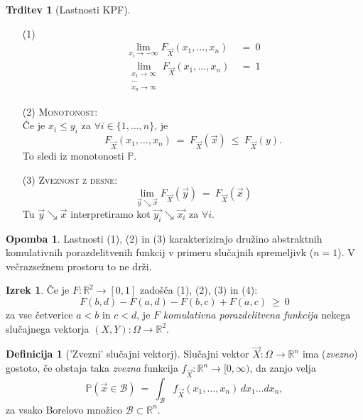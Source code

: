 \documentclass[11pt]{article}
\newcommand{\1}{\mathbbm{1}}
\theoremstyle{definition}
\newtheorem{definicija}{Definicija}[section]
\theoremstyle{definition}
\newtheorem{trditev}{Trditev}[section]
\theoremstyle{definition}
\newtheorem{izrek}{Izrek}[section]
\newtheorem*{opomba}{Opomba}
\begin{document}
\begin{trditev}[Lastnosti KPF]
~
\begin{enumerate}

	\item[(1)] \begin{align*}
		\lim_{x_i \rightarrow -\infty} F_{\vec{X}}(x_1, \ldots, x_n) ~&=~ 0 \\
		\lim_{\substack{x_1 \rightarrow \infty \\ \cdots \\ x_n \rightarrow \infty}} F_{\vec{X}}(x_1, \ldots, x_n) ~&=~ 1 
		\end{align*}
	
	\item[(2)] \textsc{Monotonost}: \\Če je $x_i \leq y_i$ za $\forall i \in \{ 1,\ldots, n \}$, je
	$$F_{\vec{X}}(x_1, \ldots, x_n) ~=~ F_{\vec{X}}(\vec{x}) ~\leq~ F_{\vec{X}}(y).$$
	To sledi iz monotonosti $\mathbb{P}$.
	
	\item[(3)] \textsc{Zveznost z desne}:
	$$\lim_{\vec{y} \searrow \vec{x}} F_{\vec{X}}(\vec{y}) ~=~ F_{\vec{X}}(\vec{x})$$
	Tu $\vec{y} \searrow \vec{x}$ interpretiramo kot $\vec{y_i} \searrow \vec{x_i}$ za $\forall i$.
	
\end{enumerate}
\end{trditev}
\vspace{0.5cm}

\begin{opomba}

Lastnosti (1), (2) in (3) karakterizirajo družino abstraktnih komulativnih porazdelitvenih funkcij v primeru slučajnih spremeljivk ($n=1$). V večrazsežnem prostoru to ne drži.

\end{opomba}
\vspace{0.5cm}

\begin{izrek}

Če je $F: \mathbb{R}^2 \rightarrow [0, 1]$ zadošča (1), (2), (3) in (4): 
$$F(b, d) - F(a, d) - F(b, c) + F(a, c) ~\geq~ 0$$
za vse četverice $a < b$ in $c < d$, je $F$ \textit{komulativna porazdelitvena funkcija} nekega slučajnega vektorja $(X, Y): \Omega \rightarrow \mathbb{R}^2$.

\end{izrek}
\vspace{0.5cm}

\begin{definicija}['Zvezni' slučajni vektorj]

Slučajni vektor $\vec{X}: \Omega \rightarrow \mathbb{R}^n$ ima (\textit{zvezno}) gostoto, če obstaja taka \textit{zvezna} funkcija $f_{\vec{X}}: \mathbb{R}^n \rightarrow [0, \infty)$, da zanjo velja
$$\mathbb{P}(\vec{x} \in \mathcal{B}) ~=~ \int_{\mathcal{B}} f_{\vec{X}}(x_1, \ldots, x_n)\,dx_1 \ldots dx_n,$$ 
za vsako Borelovo množico $\mathcal{B} \subset \mathbb{R}^n$.

\end{definicija}
\vspace{0.5cm}
\end{document}
